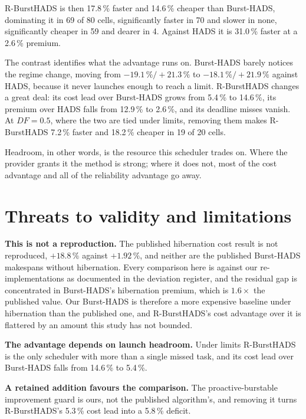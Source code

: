 \documentclass[conference]{IEEEtran}
\begin{document}
R-BurstHADS is then 17.8\,\% faster and 14.6\,\% cheaper than Burst-HADS,
dominating it in 69 of 80 cells, significantly faster in 70 and slower in none,
significantly cheaper in 59 and dearer in 4. Against HADS it is 31.0\,\% faster
at a 2.6\,\% premium.

The contrast identifies what the advantage runs on. Burst-HADS barely notices
the regime change, moving from $-19.1\,\%/+21.3\,\%$ to
$-18.1\,\%/+21.9\,\%$ against HADS, because it never launches enough to reach a
limit. R-BurstHADS changes a great deal: its cost lead over Burst-HADS grows
from 5.4\,\% to 14.6\,\%, its premium over HADS falls from 12.9\,\% to 2.6\,\%,
and its deadline misses vanish. At $DF = 0.5$, where the two are tied under
limits, removing them makes R-BurstHADS 7.2\,\% faster and 18.2\,\% cheaper in
19 of 20 cells.

Headroom, in other words, is the resource this scheduler trades on. Where the
provider grants it the method is strong; where it does not, most of the cost
advantage and all of the reliability advantage go away.

\section{Threats to validity and limitations}
\label{sec:limitations}

\textbf{This is not a reproduction.} The published hibernation cost result is
not reproduced, $+18.8\,\%$ against $+1.92\,\%$, and neither are the published
Burst-HADS makespans without hibernation. Every comparison here is against our
re-implementations as documented in the deviation register, and the residual
gap is concentrated in Burst-HADS's hibernation premium, which is
$1.6\times$ the published value. Our Burst-HADS is therefore a more expensive
baseline under hibernation than the published one, and R-BurstHADS's cost
advantage over it is flattered by an amount this study has not bounded.

\textbf{The advantage depends on launch headroom.} Under limits R-BurstHADS is
the only scheduler with more than a single missed task, and its cost lead over
Burst-HADS falls from 14.6\,\% to 5.4\,\%.

\textbf{A retained addition favours the comparison.} The proactive-burstable
improvement guard is ours, not the published algorithm's, and removing it turns
R-BurstHADS's 5.3\,\% cost lead into a 5.8\,\% deficit.
\end{document}
